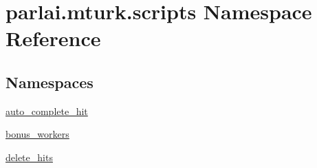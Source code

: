\hypertarget{namespaceparlai_1_1mturk_1_1scripts}{}\section{parlai.\+mturk.\+scripts Namespace Reference}
\label{namespaceparlai_1_1mturk_1_1scripts}
\subsection*{Namespaces}
\begin{DoxyCompactItemize}
\item 
 \hyperlink{namespaceparlai_1_1mturk_1_1scripts_1_1auto__complete__hit}{auto\+\_\+complete\+\_\+hit}
\item 
 \hyperlink{namespaceparlai_1_1mturk_1_1scripts_1_1bonus__workers}{bonus\+\_\+workers}
\item 
 \hyperlink{namespaceparlai_1_1mturk_1_1scripts_1_1delete__hits}{delete\+\_\+hits}
\end{DoxyCompactItemize}
